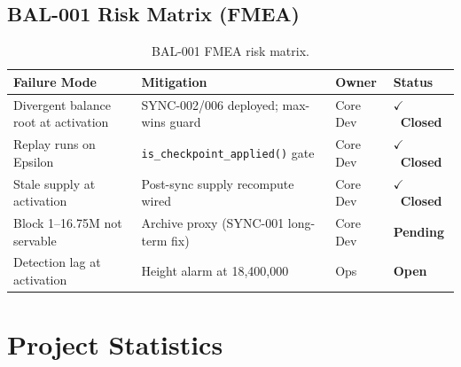 \documentclass[12pt,a4paper]{article}
\newcommand{\statusopen}{\textcolor{qred}{\bfseries Open}}
\newcommand{\statusclosed}{\textcolor{qgreen}{\bfseries $\checkmark$~Closed}}
\newcommand{\statuspending}{\textcolor{qorange}{\bfseries Pending}}
\begin{document}
\subsection{BAL-001 Risk Matrix (FMEA)}

\begin{table}[H]
\centering
\small
\begin{tabularx}{\linewidth}{lXll}
\toprule
\textbf{Failure Mode} & \textbf{Mitigation} & \textbf{Owner} & \textbf{Status} \\
\midrule
Divergent balance root at activation & SYNC-002/006 deployed; max-wins guard & Core Dev & \statusclosed \\
\rowcolor{rowgray}
Replay runs on Epsilon & \texttt{is\_checkpoint\_applied()} gate & Core Dev & \statusclosed \\
Stale supply at activation & Post-sync supply recompute wired & Core Dev & \statusclosed \\
\rowcolor{rowgray}
Block 1--16.75M not servable & Archive proxy (SYNC-001 long-term fix) & Core Dev & \statuspending \\
Detection lag at activation & Height alarm at 18,400,000 & Ops & \statusopen \\
\bottomrule
\end{tabularx}
\caption{BAL-001 FMEA risk matrix.}
\end{table}

\section{Project Statistics}
\end{document}
